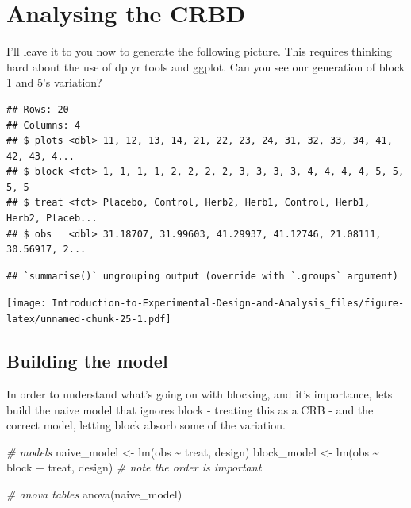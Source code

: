 \documentclass[
]{book}
\newenvironment{Shaded}{\begin{snugshade}}{\end{snugshade}}
\newcommand{\CommentTok}[1]{\textcolor[rgb]{0.56,0.35,0.01}{\textit{#1}}}
\newcommand{\FunctionTok}[1]{\textcolor[rgb]{0.00,0.00,0.00}{#1}}
\newcommand{\NormalTok}[1]{#1}
\newcommand{\OtherTok}[1]{\textcolor[rgb]{0.56,0.35,0.01}{#1}}
\newcommand{\SpecialCharTok}[1]{\textcolor[rgb]{0.00,0.00,0.00}{#1}}
\begin{document}
\hypertarget{analysing-the-crbd}{%
\section{Analysing the CRBD}\label{analysing-the-crbd}}

I'll leave it to you now to generate the following picture. This requires thinking hard about the use of dplyr tools and ggplot. Can you see our generation of block 1 and 5's variation?

\begin{verbatim}
## Rows: 20
## Columns: 4
## $ plots <dbl> 11, 12, 13, 14, 21, 22, 23, 24, 31, 32, 33, 34, 41, 42, 43, 4...
## $ block <fct> 1, 1, 1, 1, 2, 2, 2, 2, 3, 3, 3, 3, 4, 4, 4, 4, 5, 5, 5, 5
## $ treat <fct> Placebo, Control, Herb2, Herb1, Control, Herb1, Herb2, Placeb...
## $ obs   <dbl> 31.18707, 31.99603, 41.29937, 41.12746, 21.08111, 30.56917, 2...
\end{verbatim}

\begin{verbatim}
## `summarise()` ungrouping output (override with `.groups` argument)
\end{verbatim}

\texttt{[image: Introduction-to-Experimental-Design-and-Analysis\_files/figure-latex/unnamed-chunk-25-1.pdf]}

\hypertarget{building-the-model}{%
\subsection{Building the model}\label{building-the-model}}

In order to understand what's going on with blocking, and it's importance, lets build the naive model that ignores block - treating this as a CRB - and the correct model, letting block absorb some of the variation.

\begin{Shaded}
\begin{Highlighting}[]
\CommentTok{\# models}
\NormalTok{naive\_model }\OtherTok{\textless{}{-}} \FunctionTok{lm}\NormalTok{(obs }\SpecialCharTok{\textasciitilde{}}\NormalTok{ treat, design)}
\NormalTok{block\_model }\OtherTok{\textless{}{-}} \FunctionTok{lm}\NormalTok{(obs }\SpecialCharTok{\textasciitilde{}}\NormalTok{ block }\SpecialCharTok{+}\NormalTok{ treat, design) }\CommentTok{\# note the order is important}

\CommentTok{\# anova tables}
\FunctionTok{anova}\NormalTok{(naive\_model)}
\end{Highlighting}
\end{Shaded}
\end{document}
